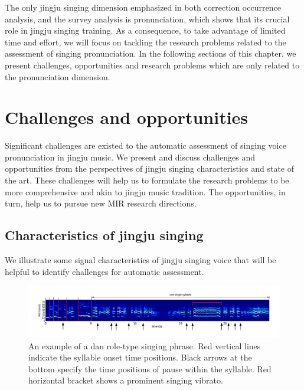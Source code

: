 The only jingju singing dimension emphasized in both correction occurrence analysis, and the survey analysis is pronunciation, which shows that its crucial role in jingju singing training. As a consequence, to take advantage of limited time and effort, we will focus on tackling the research problems related to the assessment of singing pronunciation. In the following sections of this chapter, we present challenges, opportunities and research problems which are only related to the pronunciation dimension.

\section{Challenges and opportunities}\label{sec:ch3:challenges_opportunities}

Significant challenges are existed to the automatic assessment of singing voice pronunciation in jingju music. We present and discuss challenges and opportunities from the perspectives of jingju singing characteristics and state of the art. These challenges will help us to formulate the research problems to be more comprehensive and akin to jingju music tradition. The opportunities, in turn, help us to pursue new MIR research directions. 

\subsection{Characteristics of jingju singing}\label{sec:ch3:char_singing}

We illustrate some signal characteristics of jingju singing voice that will be helpful to identify challenges for automatic assessment. 

\begin{landscape}
\mbox{}\vfill
\begin{figure}[ht!]
\includegraphics[width=1.8\textwidth]{figs/spectro_vis/ch3_jingju_char.png}
\caption{An example of a dan role-type singing phrase. Red vertical lines indicate the syllable onset time positions. Black arrows at the bottom specify the time positions of pause within the syllable. Red horizontal bracket shows a prominent singing vibrato.}
\label{fig:jingju_char}
\end{figure}
\vfill
\end{landscape}

